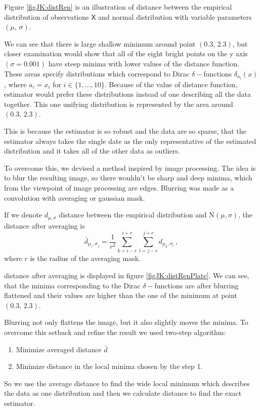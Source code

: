 {Figure \ref{figJK:distRen} is an illustration of \R distance between the empirical distribution of observations $\mathsf{X}$ and normal distribution with variable parameters $(\mu,\, \sigma)$. 

We can see that there is large shallow minimum around point $(0.3, \, 2.3)$, but closer examination would show that all of the eight bright points on the y axis $(\sigma = 0.001)$ have steep minima with lower values of the distance function. These areas specify distributions which correspond to Dirac $\delta-$functions $\delta_{a_i}(x)$, where $a_i = x_i$ for $i \in \{1,\ldots,10\}$. Because of the value of distance function, \R estimator would prefer these distributions instead of one describing all the data together. This one unifying distribution is represented by the area around $(0.3, \, 2.3)$. 

This is because the estimator is so robust and the data are so sparse, that the estimator always takes the single date as the only representative of the estimated distribution and it takes all of the other data as outliers. 

To overcome this, we devised a method inspired by image processing. The idea is to blur the resulting image, so there wouldn't be sharp and deep minima, which from the viewpoint of image processing are edges. Blurring was made as a convolution with averaging or gaussian mask. 

If we denote $d_{\mu, \sigma}$ \R distance between the empirical distribution and $\mathrm{N}(\mu,\sigma)$, the distance after averaging is 
\begin{equation}
\bar{d}_{\mu_i, \sigma_j} = \dfrac{1}{r^2}\sum_{k=i-r}^{i+r} \sum_{l=j-r}^{j+r} d_{\mu_k, \sigma_l} \, ,
\end{equation}
where $r$ is the radius of the averaging mask.

\R distance after averaging is displayed in figure \ref{figJK:distRenPlate}. We can see, that the minima corresponding to the Dirac $\delta-$functions are after blurring flattened and their values are higher than the one of the minimum at point $(0.3, \, 2.3)$.

Blurring not only flattens the image, but it also slightly moves the minima. To overcome this setback and refine the result we used two-step algorithm:
\begin{enumerate}
\item Minimize averaged distance $\bar{d}$
\item Minimize \R distance in the local minima chosen by the step 1.
\end{enumerate}
So we use the average \R distance to find the wide local minimum which describes the data as one distribution and then we calculate \R distance to find the exact estimator. 

}
